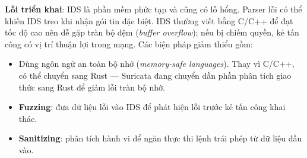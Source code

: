 \documentclass[../main.tex]{subfiles}
\begin{document}
\textbf{Lỗi triển khai}: IDS là phần mềm phức tạp và cũng có lỗ hổng. Parser lỗi có thể khiến IDS treo khi nhận gói tin đặc biệt. IDS thường viết bằng C/C++ để đạt tốc độ cao nên dễ gặp tràn bộ đệm (\textit{buffer overflow}); nếu bị chiếm quyền, kẻ tấn công có vị trí thuận lợi trong mạng. Các biện pháp giảm thiểu gồm:
\begin{itemize}
    \item Dùng ngôn ngữ an toàn bộ nhớ (\textit{memory-safe languages}). Thay vì C/C++, có thể chuyển sang Rust --- Suricata đang chuyển dần phần phân tích giao thức sang Rust để giảm lỗi tràn bộ nhớ.
    \item \textbf{Fuzzing}: đưa dữ liệu lỗi vào IDS để phát hiện lỗi trước kẻ tấn công khai thác.
    \item \textbf{Sanitizing}: phân tích hành vi để ngăn thực thi lệnh trái phép từ dữ liệu đầu vào.
\end{itemize}
\end{document}
